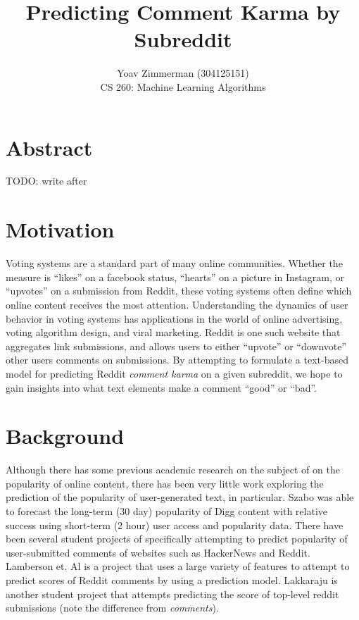 \documentclass[11pt, twocolumn]{article}
\begin{document}
\title{Predicting Comment Karma by Subreddit}
\author{Yoav Zimmerman (304125151) \\
	    CS 260: Machine Learning Algorithms \\}
\maketitle

\section{Abstract}

TODO: write after

\section{Motivation}

Voting systems are a standard part of many online communities. Whether the measure is ``likes'' on a facebook status, “hearts” on a picture in Instagram, or “upvotes” on a submission from Reddit, these voting systems often define which online content receives the most attention. Understanding the dynamics of user behavior in voting systems has applications in the world of online advertising, voting algorithm design, and viral marketing. Reddit is one such website that aggregates link submissions, and allows users to either “upvote” or “downvote” other users comments on submissions. By attempting to formulate a text-based model for predicting Reddit \textit{comment karma} on a given subreddit, we hope to gain insights into what text elements make a comment ``good'' or ``bad''.

\section{Background}

Although there has some previous academic research on the subject of on the popularity of online content, there has been very little work exploring the prediction of the popularity of user-generated text, in particular. Szabo \cite{predict_digg} was able to forecast the long-term (30 day) popularity of Digg content with relative success using short-term (2 hour) user access and popularity data. There have been several student projects of specifically attempting to predict popularity of user-submitted comments of websites such as HackerNews and Reddit. Lamberson et. Al \cite{lamberson} is a project that uses a large variety of features to attempt to predict scores of Reddit comments by using a prediction model. Lakkaraju is another student project that attempts predicting the score of top-level reddit submissions (note the difference from \textit{comments}). 
\end{document}
